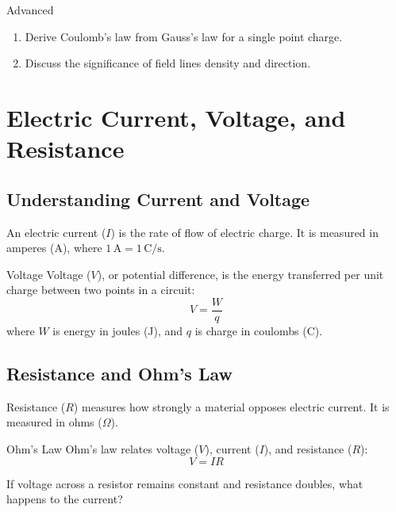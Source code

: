 \begin{tieredquestions}{Advanced}
\begin{enumerate}
    \item Derive Coulomb's law from Gauss's law for a single point charge.
    \item Discuss the significance of field lines density and direction.
\end{enumerate}
\end{tieredquestions}

\FloatBarrier

\section{Electric Current, Voltage, and Resistance}
\FloatBarrier

\subsection{Understanding Current and Voltage}
\FloatBarrier

An electric current ($I$) is the rate of flow of electric charge. It is measured in amperes (A), where $1\,\text{A} = 1\,\text{C}/\text{s}$.

\begin{keyconcept}{Voltage}
Voltage ($V$), or potential difference, is the energy transferred per unit charge between two points in a circuit:
\[
V = \frac{W}{q}
\]
where $W$ is energy in joules (J), and $q$ is charge in coulombs (C).
\end{keyconcept}

\subsection{Resistance and Ohm's Law}
\FloatBarrier

Resistance ($R$) measures how strongly a material opposes electric current. It is measured in ohms ($\Omega$).

\begin{keyconcept}{Ohm's Law}
Ohm's law relates voltage ($V$), current ($I$), and resistance ($R$):
\[
V = IR
\]
\end{keyconcept}


\begin{stopandthink}
If voltage across a resistor remains constant and resistance doubles, what happens to the current?
\end{stopandthink}

